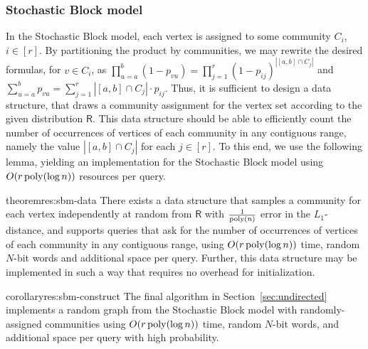 \subsubsection{Stochastic Block model}
\label{sec:application_sbm}
In the Stochastic Block model, each vertex is assigned to some community $C_i$, $i \in [r]$.
By partitioning the product by communities, we may rewrite the desired formulas, for $v \in C_i$,
as $\prod_{u=a}^b (1-p_{vu}) = \prod_{j=1}^r (1-p_{ij})^{|[a,b]\cap C_j|}$ and $\sum_{u=a}^b p_{vu}=\sum_{j=1}^r |[a,b]\cap C_j|\cdot p_{ij}$.
Thus, it is sufficient to design a data structure,
that draws a community assignment for the vertex set according to the given distribution $\mathsf{R}$.
This data structure should be able to efficiently count the number of occurrences of vertices of each community in any contiguous range,
namely the value $|[a,b]\cap C_j|$ for each $j \in [r]$.
To this end, we use the following lemma,
yielding an implementation for the Stochastic Block model using $O(r\, \mathrm{poly}(\log n))$ resources per query.

\begin{restatable}{theorem}{res:sbm-data}\label{thm:sbm-data}
There exists a data structure that samples a community for each vertex independently at random from $\mathsf{R}$
with $\frac{1}{\mathrm{poly}(n)}$ error in the $L_1$-distance, and supports queries that ask for the number of occurrences of vertices of each community
in any contiguous range, using $O(r\,\mathrm{poly}(\log n))$ time, random $N$-bit words and additional space per query.
Further, this data structure may be implemented in such a way that requires no overhead for initialization.
\end{restatable}
\begin{restatable}{corollary}{res:sbm-construct}\label{cor:sbm-construct}
The final algorithm in Section~\ref{sec:undirected} implements a random graph from the Stochastic Block model with randomly-assigned communities
using $O(r\,\mathrm{poly}(\log n))$ time, random $N$-bit words, and additional space per query with high probability.
\end{restatable}


